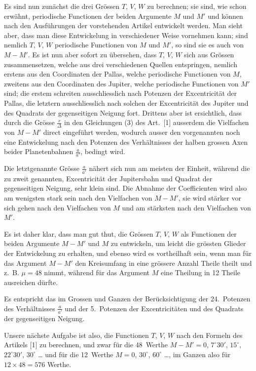 \documentclass[12pt,a4paper]{article}
\begin{document}
Es sind nun zunächst die drei Grössen $T$, $V$, $W$ zu berechnen; sie sind, wie schon erwähnt, periodische Functionen der beiden Argumente $M$ und $M'$ und können nach den Ausführungen der vorstehenden Artikel entwickelt werden. Man sieht aber, dass man diese Entwickelung in verschiedener Weise vornehmen kann; sind nemlich $T$, $V$, $W$ periodische Functionen von $M$ und $M'$, so sind sie es auch von $M-M'$. Es ist nun aber sofort zu übersehen, dass $T$, $V$, $W$ sich aus Grössen zusammensetzen, welche aus drei verschiedenen Quellen entspringen, nemlich erstens aus den Coordinaten der Pallas, welche periodische Functionen von $M$, zweitens aus den Coordinaten des Jupiter, welche periodische Functionen von $M'$ sind; die erstem schreiten ausschliesslich nach Potenzen der Excentricität der Pallas, die letztern ausschliesslich nach solchen der Excentricität des Jupiter und des Quadrats der gegenseitigen Neigung fort. Drittens aber ist ersichtlich, dass durch die Grösse $\frac{r}{\Delta}$ in den Gleichungen (3) des Art.~[1] ausserdem die Vielfachen von $M-M'$ direct eingeführt werden, wodurch ausser den vorgenannten noch eine Entwickelung nach den Potenzen des Verhältnisses der halben grossen Axen beider Planetenbahnen $\frac{a}{a'}$, bedingt wird.

Die letztgenannte Grösse $\frac{a}{a'}$ nähert sich nun am meisten der Einheit, während die zu zweit genannten, Excentricität der Jupitersbahn und Quadrat der gegenseitigen Neigung, sehr klein sind. Die Abnahme der Coefficienten wird also am wenigsten stark sein nach den Vielfachen von $M-M'$, sie wird stärker vor sich gehen nach den Vielfachen von $M$ und am stärksten nach den Vielfachen von $M'$.

Es ist daher klar, dass man gut thut, die Grössen $T$, $V$, $W$ als Functionen der beiden Argumente $M-M'$ und $M$ zu entwickeln, um leicht die grössten Glieder der Entwickelung zu erhalten, und ebenso wird es vortheilhaft sein, wenn man für das Argument $M-M'$ den Kreisumfang in eine grössere Anzahl Theile theilt und z.~B. $\mu = 48$ nimmt, während für das Argument $M$ eine Theilung in 12 Theile ausreichen dürfte.

Es entspricht das im Grossen und Ganzen der Berücksichtigung der 24.~Potenzen des Verhältnisses $\frac{a}{a'}$ und der 5.~Potenzen der Excentricitäten und des Quadrats der gegenseitigen Neigung.

Unsere nächste Aufgabe ist also, die Functionen $T$, $V$, $W$ nach den Formeln des Artikels [1] zu berechnen, und zwar für die 48~Werthe $M-M' = 0$, $7^{\circ}30'$, $15^{\circ}$, $22^{\circ}30'$, $30^{\circ}$ \ldots{} und für die 12~Werthe $M = 0$, $30^{\circ}$, $60^{\circ}$ \ldots{}, im Ganzen also für $12 \times 48 = 576$ Werthe.
\end{document}
